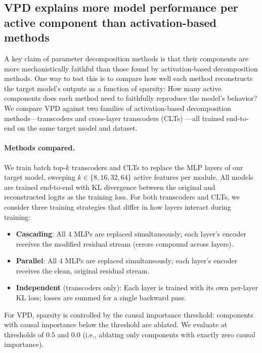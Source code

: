 \subsection{VPD explains more model performance per active component than activation-based methods}
\label{sec:pareto-comparison}

A key claim of parameter decomposition methods is that their components are more mechanistically faithful than those found by activation-based decomposition methods. One way to test this is to compare how well each method reconstructs the target model's outputs as a function of sparsity: How many active components does each method need to faithfully reproduce the model's behavior? We compare VPD against two families of activation-based decomposition methods---transcoders \cite{dunefsky2024transcodersinterpretablellmfeature} and cross-layer transcoders (CLTs) \cite{lindsey2024crosscoders}---all trained end-to-end on the same target model and dataset.

\paragraph{Methods compared.}
We train batch top-$k$ transcoders and CLTs to replace the MLP layers of our target model, sweeping $k \in \{8, 16, 32, 64\}$ active features per module. All models are trained end-to-end with KL divergence between the original and reconstructed logits as the training loss. For both transcoders and CLTs, we consider three training strategies that differ in how layers interact during training:
\begin{itemize}
    \item \textbf{Cascading}: All 4 MLPs are replaced simultaneously; each layer's encoder receives the modified residual stream (errors compound across layers).
    \item \textbf{Parallel}: All 4 MLPs are replaced simultaneously; each layer's encoder receives the clean, original residual stream.
    \item \textbf{Independent} (transcoders only): Each layer is trained with its own per-layer KL loss; losses are summed for a single backward pass.
\end{itemize}
For VPD, sparsity is controlled by the causal importance threshold: components with causal importance below the threshold are ablated. We evaluate at thresholds of $0.5$ and $0.0$ (i.e., ablating only components with exactly zero causal importance).

